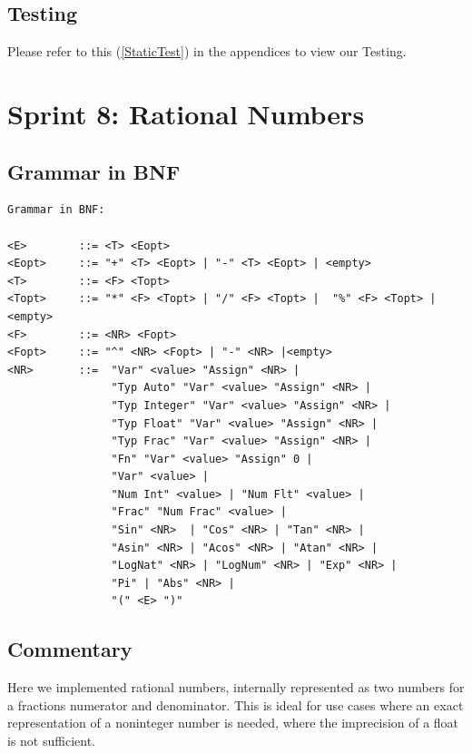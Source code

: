 \documentclass[a4paper, oneside, 11pt]{report}
\begin{document}
\subsection{Testing}
Please refer to this (\ref{StaticTest}) in the appendices to view our Testing. \\


\clearpage
\section{Sprint 8: Rational Numbers}
\subsection{Grammar in BNF}
\begin{verbatim}
Grammar in BNF:

<E>        ::= <T> <Eopt>
<Eopt>     ::= "+" <T> <Eopt> | "-" <T> <Eopt> | <empty>
<T>        ::= <F> <Topt>
<Topt>     ::= "*" <F> <Topt> | "/" <F> <Topt> |  "%" <F> <Topt> |<empty>
<F>        ::= <NR> <Fopt>
<Fopt>     ::= "^" <NR> <Fopt> | "-" <NR> |<empty> 
<NR>       ::=  "Var" <value> "Assign" <NR> |
                "Typ Auto" "Var" <value> "Assign" <NR> |
                "Typ Integer" "Var" <value> "Assign" <NR> |
                "Typ Float" "Var" <value> "Assign" <NR> |
                "Typ Frac" "Var" <value> "Assign" <NR> |
                "Fn" "Var" <value> "Assign" 0 |
                "Var" <value> |
                "Num Int" <value> | "Num Flt" <value> |
                "Frac" "Num Frac" <value> |
                "Sin" <NR>  | "Cos" <NR> | "Tan" <NR> |
                "Asin" <NR> | "Acos" <NR> | "Atan" <NR> |
                "LogNat" <NR> | "LogNum" <NR> | "Exp" <NR> |
                "Pi" | "Abs" <NR> |
                "(" <E> ")"
\end{verbatim}
\subsection{Commentary}
Here we implemented rational numbers, internally represented as two numbers for a fractions numerator and denominator. This is ideal for use cases where an exact representation of a noninteger number is needed, where the imprecision of a float is not sufficient.
\end{document}
